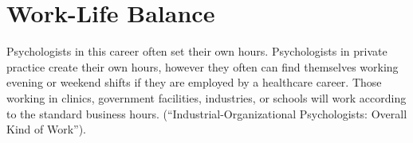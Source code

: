 \section{Work-Life Balance}
Psychologists in this career often set their own hours. Psychologists in private practice create their own hours, however they often can find themselves working evening or weekend shifts if they are employed by a healthcare career. Those working in clinics, government facilities, industries, or schools will work according to the standard business hours. (“Industrial-Organizational Psychologists: Overall Kind of Work”). 
